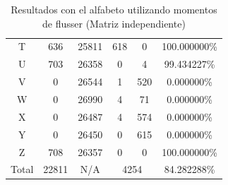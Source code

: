 \documentclass[a4paper, 11pt, oneside]{report}
\begin{document}
\begin{table}
\begin{tabular}{|c|c|c|c|c|c|}
T & 636 & 25811 & 618 & 0 & 100.000000\% \\ 
U & 703 & 26358 & 0 & 4 & 99.434227\% \\ 
V & 0 & 26544 & 1 & 520 & 0.000000\% \\ 
W & 0 & 26990 & 4 & 71 & 0.000000\% \\ 
X & 0 & 26487 & 4 & 574 & 0.000000\% \\ 
Y & 0 & 26450 & 0 & 615 & 0.000000\% \\ 
Z & 708 & 26357 & 0 & 0 & 100.000000\% \\ 
\hline
Total & 22811 & N/A & \multicolumn{2}{|c|}{4254} & 84.282288\% \\
\hline
\end{tabular}
\caption{Resultados con el alfabeto utilizando momentos de flusser (Matriz independiente)}
\label{tb:alphaRotIndep}
\end{table}
\end{document}
